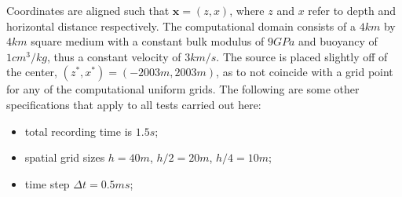 Coordinates are aligned such that $\mathbf x = (z,x)$, 
where $z$ and $x$ refer to depth and horizontal distance respectively.  
The computational domain consists of a $4km$ by $4km$ square medium
with a constant bulk modulus of $9 GPa$ and buoyancy of $1 cm^3/kg$,
thus a constant velocity of $3 km/s$.
The source is placed slightly off of the center, $(z^*,x^*)=(-2003m,2003m)$, 
as to not coincide with a grid point for any of the computational uniform grids.
The following are some other specifications that apply to all tests carried out here:
\begin{itemize}
        \item total recording time is $1.5s$;
        \item spatial grid sizes $h=40m$, $h/2=20m$, $h/4=10m$;
        \item time step $\Delta t=0.5ms$;
\end{itemize}


